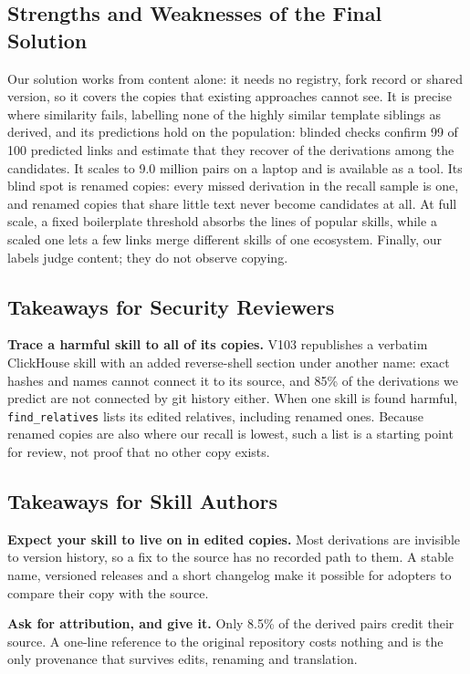 \documentclass[sigconf,screen]{acmart}
\begin{document}
\subsection{Strengths and Weaknesses of the Final Solution}
Our solution works from content alone: it needs no registry, fork record or shared version, so it covers the copies that existing approaches cannot see. It is precise where similarity fails, labelling none of the highly similar template siblings as derived, and its predictions hold on the population: blinded checks confirm 99 of 100 predicted links and estimate that they recover \ResRCRecall{} of the derivations among the candidates. It scales to 9.0 million pairs on a laptop and is available as a tool. Its blind spot is renamed copies: every missed derivation in the recall sample is one, and renamed copies that share little text never become candidates at all. At full scale, a fixed boilerplate threshold absorbs the lines of popular skills, while a scaled one lets a few links merge different skills of one ecosystem. Finally, our labels judge content; they do not observe copying.
 
\subsection{Takeaways for Security Reviewers}
\textbf{Trace a harmful skill to all of its copies.} V103 republishes a verbatim ClickHouse skill with an added reverse-shell section under another name: exact hashes and names cannot connect it to its source, and 85\% of the derivations we predict are not connected by git history either. When one skill is found harmful, \texttt{find\_relatives} lists its edited relatives, including renamed ones. Because renamed copies are also where our recall is lowest, such a list is a starting point for review, not proof that no other copy exists.
 
\subsection{Takeaways for Skill Authors}
\textbf{Expect your skill to live on in edited copies.} Most derivations are invisible to version history, so a fix to the source has no recorded path to them. A stable name, versioned releases and a short changelog make it possible for adopters to compare their copy with the source.
 
\textbf{Ask for attribution, and give it.} Only 8.5\% of the derived pairs credit their source. A one-line reference to the original repository costs nothing and is the only provenance that survives edits, renaming and translation.
 
\end{document}
